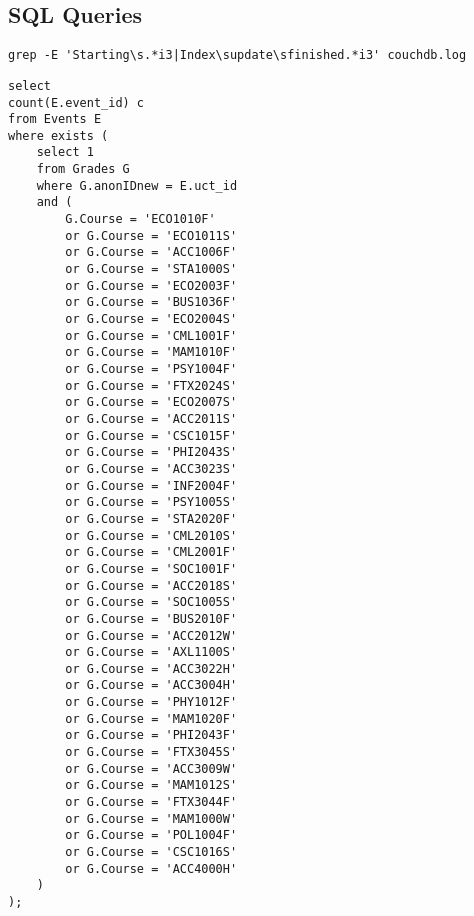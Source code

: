 \subsection{SQL Queries}
\label{appendix:sql}

\begin{verbatim}
grep -E 'Starting\s.*i3|Index\supdate\sfinished.*i3' couchdb.log
\end{verbatim}


\begin{verbatim}
select
count(E.event_id) c 
from Events E
where exists (
    select 1
    from Grades G
    where G.anonIDnew = E.uct_id
    and (
        G.Course = 'ECO1010F'
        or G.Course = 'ECO1011S'
        or G.Course = 'ACC1006F'
        or G.Course = 'STA1000S'
        or G.Course = 'ECO2003F'
        or G.Course = 'BUS1036F'
        or G.Course = 'ECO2004S'
        or G.Course = 'CML1001F'
        or G.Course = 'MAM1010F'
        or G.Course = 'PSY1004F'
        or G.Course = 'FTX2024S'
        or G.Course = 'ECO2007S'
        or G.Course = 'ACC2011S'
        or G.Course = 'CSC1015F'
        or G.Course = 'PHI2043S'
        or G.Course = 'ACC3023S'
        or G.Course = 'INF2004F'
        or G.Course = 'PSY1005S'
        or G.Course = 'STA2020F'
        or G.Course = 'CML2010S'
        or G.Course = 'CML2001F'
        or G.Course = 'SOC1001F'
        or G.Course = 'ACC2018S'
        or G.Course = 'SOC1005S'
        or G.Course = 'BUS2010F'
        or G.Course = 'ACC2012W'
        or G.Course = 'AXL1100S'
        or G.Course = 'ACC3022H'
        or G.Course = 'ACC3004H'
        or G.Course = 'PHY1012F'
        or G.Course = 'MAM1020F'
        or G.Course = 'PHI2043F'
        or G.Course = 'FTX3045S'
        or G.Course = 'ACC3009W'
        or G.Course = 'MAM1012S'
        or G.Course = 'FTX3044F'
        or G.Course = 'MAM1000W'
        or G.Course = 'POL1004F'
        or G.Course = 'CSC1016S'
        or G.Course = 'ACC4000H'
    )
);
\end{verbatim}